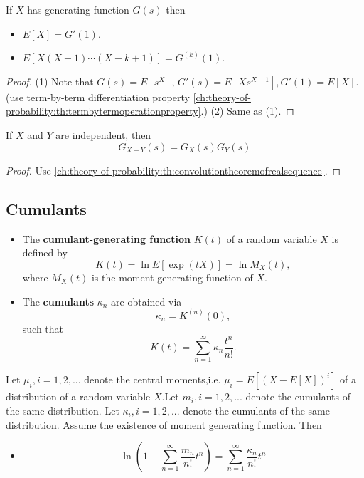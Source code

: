 \begin{refsection}
\begin{lemma}\cite[151]{grimmett2001probability}
If $X$ has generating function $G(s)$ then
\begin{itemize}
	\item $E[X] = G'(1)$.
	\item $E[X(X-1)\cdots(X-k+1)] = G^{(k)}(1)$.
\end{itemize}
\end{lemma}
\begin{proof}
(1) Note that $G(s) = E[s^X]$, $G'(s) = E[Xs^{X-1}],G'(1) = E[X]$.(use term-by-term differentiation property \autoref{ch:theory-of-probability:th:termbytermoperationproperty}.)
(2) Same as (1).
\end{proof}

\begin{lemma}\cite[153]{grimmett2001probability}
If $X$ and $Y$ are independent, then 
$$G_{X+Y}(s) = G_X(s)G_Y(s)$$
\end{lemma}
\begin{proof}
Use \autoref{ch:theory-of-probability:th:convolutiontheoremofrealsequence}.
\end{proof}

\subsection{Cumulants}
\begin{definition}\hfill
	\begin{itemize}
		\item The \textbf{cumulant-generating function} $K(t)$ of a random variable $X$ is defined by
		$$K(t) = \ln E[\exp(tX)] = \ln M_X(t),$$
		where $M_X(t)$ is the moment generating function of $X$.
		\item The \textbf{cumulants} $\kappa_n$ are obtained via
		$$\kappa_n = K^{(n)}(0),$$
		such that
		$$K(t) = \sum_{n=1}^{\infty} \kappa_n \frac{t^n}{n!}.$$
	\end{itemize}	
\end{definition}

\begin{lemma}
	Let $\mu_i,i=1,2,...$ denote the central moments,i.e. $\mu_i = E[(X - E[X])^i]$ of a distribution of a random variable $X$.Let $m_i,i=1,2,...$ denote the cumulants of the same distribution. Let $\kappa_i,i=1,2,...$ denote the cumulants of the same distribution. Assume the existence of moment generating function. Then
	\begin{itemize}
		\item 
		$$\ln (1 + \sum_{n=1}^{\infty} \frac{m_n}{n!}t^n) = \sum_{n=1}^{\infty} \frac{\kappa_n}{n!}t^n$$
		

\end{itemize}
\end{lemma}
\end{refsection}
